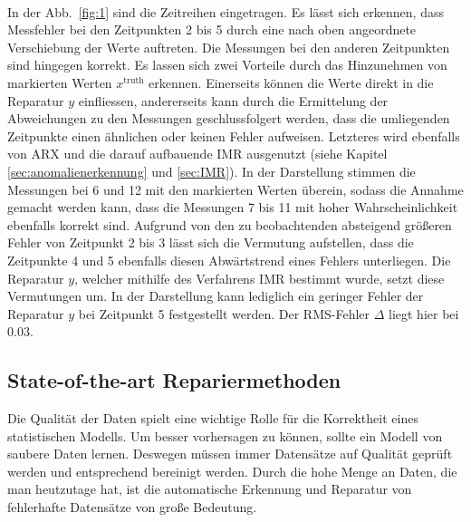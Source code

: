 ~\\
In der Abb.\ \ref{fig:1} sind die Zeitreihen eingetragen. Es lässt sich
erkennen, dass Messfehler bei den Zeitpunkten 2 bis 5 durch eine nach oben
angeordnete Verschiebung der Werte auftreten. Die Messungen bei den anderen
Zeitpunkten sind hingegen korrekt.  Es lassen sich zwei Vorteile durch das
Hinzunehmen von markierten Werten $x^{\text{truth}}$ erkennen.  Einerseits
können die Werte direkt in die Reparatur $y$ einfliessen, andererseits kann
durch die Ermittelung der Abweichungen zu den Messungen geschlussfolgert
werden, dass die umliegenden Zeitpunkte einen ähnlichen oder keinen Fehler
aufweisen.  Letzteres wird ebenfalls von ARX und die darauf aufbauende IMR
ausgenutzt (siehe Kapitel \ref{sec:anomalienerkennung} und \ref{sec:IMR}). In
der Darstellung stimmen die Messungen bei 6 und 12 mit den markierten Werten
überein, sodass die Annahme gemacht werden kann, dass die Messungen 7 bis 11
mit hoher Wahrscheinlichkeit ebenfalls korrekt sind.  Aufgrund von den zu
beobachtenden absteigend größeren Fehler von Zeitpunkt 2 bis 3 lässt sich die
Vermutung aufstellen, dass die Zeitpunkte 4 und 5 ebenfalls diesen Abwärtstrend
eines Fehlers unterliegen. Die Reparatur $y$, welcher mithilfe des Verfahrens IMR
bestimmt wurde, setzt diese Vermutungen um.  In der Darstellung kann lediglich
ein geringer Fehler der Reparatur $y$ bei Zeitpunkt 5 festgestellt werden. Der
RMS-Fehler $\Delta$ liegt hier bei $0.03$.   

\subsection{State-of-the-art Repariermethoden}
Die Qualität der Daten spielt eine wichtige Rolle für die Korrektheit
eines statistischen Modells. Um besser vorhersagen zu können, sollte ein Modell
von saubere Daten lernen. Deswegen müssen immer Datensätze auf Qualität geprüft
werden und entsprechend bereinigt werden. Durch die hohe Menge an Daten, die
man heutzutage hat, ist die automatische Erkennung und Reparatur von
fehlerhafte Datensätze von große Bedeutung.

